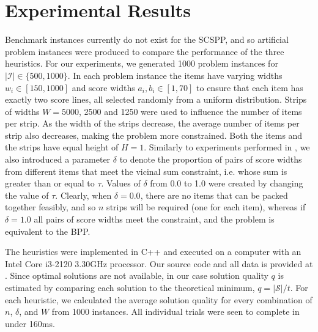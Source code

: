 \documentclass[runningheads]{llncs}
\begin{document}
\section{Experimental Results}
\label{sec:expresults}
Benchmark instances currently do not exist for the SCSPP, and so artificial problem instances were produced to compare the performance of the three heuristics. For our experiments, we generated 1000 problem instances for $|\mathcal{I}| \in \{500, 1000\}$. In each problem instance the items have varying widths $w_i \in [150,1000]$ and score widths $a_i, b_i \in [1, 70]$ to ensure that each item has exactly two score lines, all selected randomly from a uniform distribution. Strips of widths $W = 5000$, 2500 and 1250 were used to influence the number of items per strip. As the width of the strips decrease, the average number of items per strip also decreases, making the problem more constrained. Both the items and the strips have equal height of $H = 1$. Similarly to experiments performed in \cite{lewis2011}, we also introduced a parameter $\delta$ to denote the proportion of pairs of score widths from different items that meet the vicinal sum constraint, i.e. whose sum is greater than or equal to $\tau$. Values of $\delta$ from 0.0 to 1.0 were created by changing the value of $\tau$. Clearly, when $\delta = 0.0$, there are no items that can be packed together feasibly, and so $n$ strips will be required (one for each item), whereas if $\delta = 1.0$ all pairs of score widths meet the constraint, and the problem is equivalent to the BPP. 

The heuristics were implemented in C++ and executed on a computer with an Intel Core i3-2120 3.30GHz processor. Our source code and all data is provided at \cite{hawa2018}. Since optimal solutions are not available, in our case solution quality $q$ is estimated by comparing each solution to the theoretical minimum, $q = |\mathcal{S}| / t$. For each heuristic, we calculated the average solution quality for every combination of $n$, $\delta$, and $W$ from 1000 instances. All individual trials were seen to complete in under 160ms.
\end{document}
